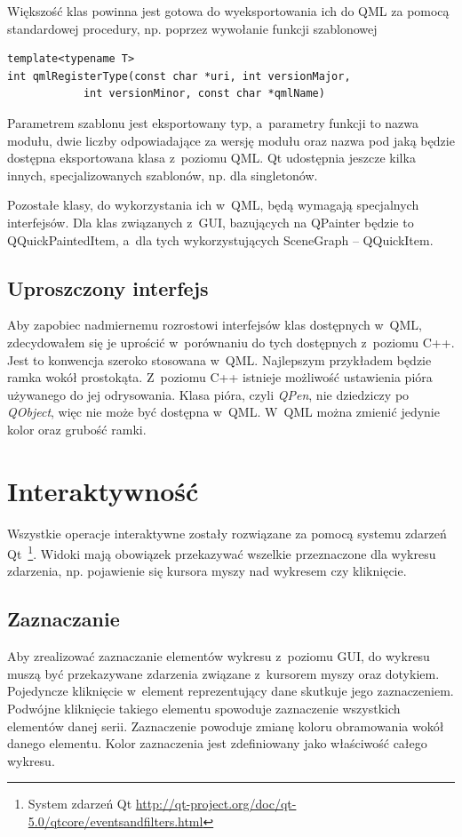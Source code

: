 Większość klas powinna jest gotowa do wyeksportowania ich do QML za pomocą standardowej procedury, np. poprzez wywołanie funkcji szablonowej
\begin{lstlisting}
template<typename T>
int qmlRegisterType(const char *uri, int versionMajor, 
		    int versionMinor, const char *qmlName)
\end{lstlisting}
Parametrem szablonu jest eksportowany typ, a~parametry funkcji to nazwa modułu, dwie liczby odpowiadające za wersję modułu oraz nazwa pod jaką będzie dostępna eksportowana klasa z~poziomu QML. Qt udostępnia jeszcze kilka innych, specjalizowanych szablonów, np. dla singletonów.

Pozostałe klasy, do wykorzystania ich w~QML, będą wymagają specjalnych interfejsów. Dla klas związanych z~GUI, bazujących na QPainter będzie to QQuickPaintedItem, a~dla tych wykorzystujących SceneGraph -- QQuickItem.

\subsection{Uproszczony interfejs}
Aby zapobiec nadmiernemu rozrostowi interfejsów klas dostępnych w~QML, zdecydowałem się je uprościć w~porównaniu do tych dostępnych z~poziomu C++. Jest to konwencja szeroko stosowana w~QML. Najlepszym przykładem będzie ramka wokół prostokąta. Z~poziomu C++ istnieje możliwość ustawienia pióra używanego do jej odrysowania. Klasa pióra, czyli \textit{QPen}, nie dziedziczy po \textit{QObject}, więc nie może być dostępna w~QML. W~QML można zmienić jedynie kolor oraz grubość ramki.

\section{Interaktywność}
Wszystkie operacje interaktywne zostały rozwiązane za pomocą systemu zdarzeń Qt~\footnote{System zdarzeń Qt \url{http://qt-project.org/doc/qt-5.0/qtcore/eventsandfilters.html}}. Widoki mają obowiązek przekazywać wszelkie przeznaczone dla wykresu zdarzenia, np. pojawienie się kursora myszy nad wykresem czy kliknięcie.

\subsection{Zaznaczanie}
Aby zrealizować zaznaczanie elementów wykresu z~poziomu GUI, do wykresu muszą być przekazywane zdarzenia związane z~kursorem myszy oraz dotykiem. Pojedyncze kliknięcie w~element reprezentujący dane skutkuje jego zaznaczeniem. Podwójne kliknięcie takiego elementu spowoduje zaznaczenie wszystkich elementów danej serii. Zaznaczenie powoduje zmianę koloru obramowania wokół danego elementu. Kolor zaznaczenia jest zdefiniowany jako właściwość całego wykresu.

